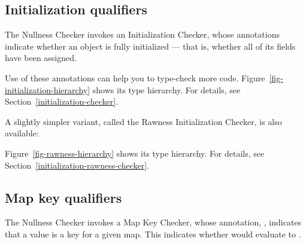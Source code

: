 \subsection{Initialization qualifiers\label{initialization-qualifiers-overview}}

The Nullness Checker invokes an Initialization Checker, whose annotations indicate whether
an object is fully initialized --- that is, whether all of its fields have
been assigned.

\begin{description}
\item[]
\item[]
\item[]
\end{description}

\noindent
Use of these annotations can help you to type-check more
code.  Figure~\ref{fig-initialization-hierarchy} shows its type hierarchy.  For
details, see Section~\ref{initialization-checker}.

A slightly simpler variant, called the Rawness Initialization Checker, is also available:

\begin{description}
\item[]
\item[]
\item[]
\end{description}

\noindent
Figure~\ref{fig-rawness-hierarchy} shows its type hierarchy.  For
details, see Section~\ref{initialization-rawness-checker}.


\subsection{Map key qualifiers\label{map-key-qualifiers}}

The Nullness Checker invokes a Map Key Checker, whose annotation,
, indicates that
a value is a key for a given map.  This indicates whether
 would evaluate to .

\begin{description}
\item[]
\end{description}

